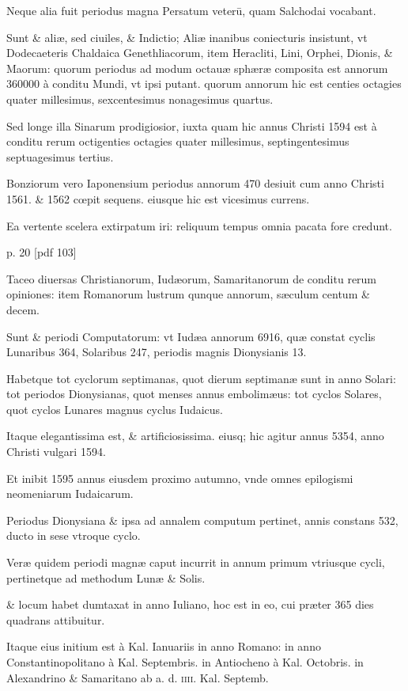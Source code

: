 Neque alia fuit periodus magna Persatum
veterū, quam Salchodai vocabant.

Sunt \& aliæ, sed ciuiles, \& Indictio;
Aliæ inanibus coniecturis insistunt, vt Dodecaeteris Chaldaica
Genethliacorum, item Heracliti, Lini, Orphei, Dionis, \& Maorum:
quorum periodus ad modum octauæ sphæræ composita est annorum
360000 à conditu Mundi, vt ipsi putant. quorum annorum hic est
centies octagies quater millesimus, sexcentesimus nonagesimus quartus.

Sed longe illa Sinarum prodigiosior, iuxta quam hic annus Christi
1594 est à conditu rerum octigenties octagies quater millesimus,
septingentesimus septuagesimus tertius.

Bonziorum vero Iaponensium
periodus annorum 470 desiuit cum anno Christi 1561. \& 1562
cœpit sequens. eiusque hic est vicesimus currens.

Ea vertente scelera
extirpatum iri: reliquum tempus omnia pacata fore credunt.



p. 20 [pdf 103]


Taceo
diuersas Christianorum, Iudæorum, Samaritanorum de conditu rerum
opiniones: item Romanorum lustrum qunque annorum, sæculum
centum \& decem.

Sunt \& periodi Computatorum: vt Iudæa
annorum 6916, quæ constat cyclis Lunaribus 364, Solaribus 247, periodis
magnis Dionysianis 13.

Habetque tot cyclorum septimanas,
quot dierum septimanæ sunt in anno Solari: tot periodos Dionysianas,
quot menses annus embolimæus: tot cyclos Solares, quot cyclos
Lunares magnus cyclus Iudaicus.

Itaque elegantissima est, \& artificiosissima.
eiusq; hic agitur annus 5354, anno Christi vulgari 1594.

Et inibit 1595 annus eiusdem proximo autumno, vnde omnes epilogismi
neomeniarum Iudaicarum.

Periodus Dionysiana \& ipsa ad
annalem computum pertinet, annis constans 532, ducto in sese vtroque
cyclo.

Veræ quidem periodi magnæ caput incurrit in annum
primum vtriusque cycli, pertinetque ad methodum Lunæ \& Solis.

\&
locum habet dumtaxat in anno Iuliano, hoc est in eo, cui præter 365
dies quadrans attibuitur.

Itaque eius initium est à Kal. Ianuariis in
anno Romano: in anno Constantinopolitano à Kal. Septembris. in
Antiocheno à Kal. Octobris. in Alexandrino \& Samaritano ab a. d.
\textsc{iiii}. Kal. Septemb.

